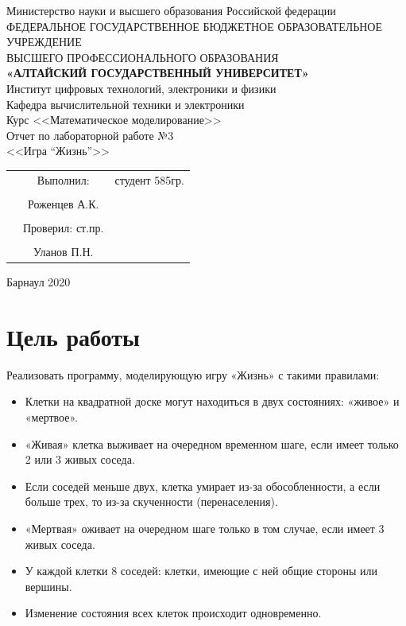 \documentclass[14pt]{extarticle}
\begin{document}
\begin{center}
\hfill \break
\large{Министерство науки и высшего образования Российской федерации}\\
\footnotesize{ФЕДЕРАЛЬНОЕ ГОСУДАРСТВЕННОЕ БЮДЖЕТНОЕ ОБРАЗОВАТЕЛЬНОЕ УЧРЕЖДЕНИЕ}\\
\footnotesize{ВЫСШЕГО ПРОФЕССИОНАЛЬНОГО ОБРАЗОВАНИЯ}\\
\small{\textbf{«АЛТАЙСКИЙ ГОСУДАРСТВЕННЫЙ УНИВЕРСИТЕТ»}}\\
\hfill \break
\normalsize{Институт цифровых технологий, электроники и физики}\\
 \hfill \break
\normalsize{Кафедра вычислительной техники и электроники}\\
\hfill\break
\hfill \break
\hfill \break
\hfill \break
\large{Курс <<Математическое моделирование>>\\ Отчет по лабораторной работе №3\\ <<Игра ``Жизнь''>>}\\
\end{center}
\hfill \break
\hfill \break
\hfill \break
\hfill \break
\hfill \break

\normalsize{
  \begin{flushright}
    \begin{tabular}{rcr}
      & Выполнил: & студент 585гр.\\\\
      & Роженцев А.К. &\underline{\hspace{3cm}}\\\\
      & Проверил: ст.пр.\\\\
      & Уланов П.Н. & \underline{\hspace{3cm}}
    \end{tabular}
  \end{flushright}
}
\hfill \break
\hfill \break
\hfill \break
\hfill \break
\hfill \break
\begin{center} Барнаул 2020 \end{center}
\thispagestyle{empty}
\newpage
\section{Цель работы}
Реализовать программу, моделирующую игру «Жизнь» с такими правилами:
\begin{itemize}
  \item Клетки на квадратной доске могут находиться в двух состояниях: «живое» и «мертвое».
  \item  «Живая» клетка выживает на очередном временном
шаге, если имеет только 2 или 3 живых соседа.
  \item Если соседей меньше двух, клетка умирает из-за обособленности, а если больше трех,
то из-за скученности (перенаселения).
  \item «Мертвая» оживает на очередном шаге только в том случае, если имеет 3 живых соседа.
  \item  У
каждой клетки 8 соседей: клетки, имеющие с ней общие стороны
или вершины.
\item Изменение состояния всех клеток происходит одновременно.

\end{itemize}
\end{document}
